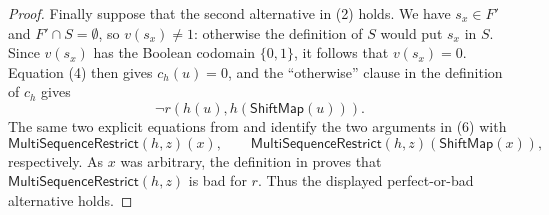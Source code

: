 \begin{proof}
Finally suppose that the second alternative in (2) holds.  We have
$s_x\in F'$ and $F'\cap S=\emptyset$, so $v(s_x)\neq 1$: otherwise the
definition of $S$ would put $s_x$ in $S$.  Since $v(s_x)$ has the Boolean
codomain $\{0,1\}$, it follows that $v(s_x)=0$.  Equation (4) then gives
$c_h(u)=0$, and the ``otherwise'' clause in the definition of $c_h$ gives
\[
 \neg r(h(u),h(\mathsf{ShiftMap}(u))).
 \tag{6}
\]
The same two explicit equations from  and
 identify the two arguments in (6) with
\[
 \mathsf{MultiSequenceRestrict}(h,z)(x),\qquad
 \mathsf{MultiSequenceRestrict}(h,z)(\mathsf{ShiftMap}(x)),
\]
respectively.  As $x$ was arbitrary, the definition in
 proves that
$\mathsf{MultiSequenceRestrict}(h,z)$ is bad for $r$.  Thus the displayed
perfect-or-bad alternative holds.
\end{proof}

